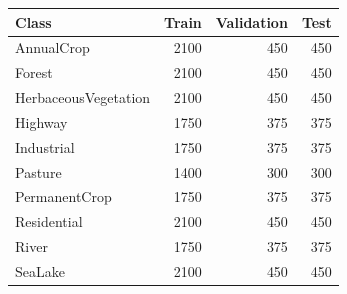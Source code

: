 \begin{tabular}{lrrr}
\toprule
Class & Train & Validation & Test \\
\midrule
AnnualCrop & 2100 & 450 & 450 \\
Forest & 2100 & 450 & 450 \\
HerbaceousVegetation & 2100 & 450 & 450 \\
Highway & 1750 & 375 & 375 \\
Industrial & 1750 & 375 & 375 \\
Pasture & 1400 & 300 & 300 \\
PermanentCrop & 1750 & 375 & 375 \\
Residential & 2100 & 450 & 450 \\
River & 1750 & 375 & 375 \\
SeaLake & 2100 & 450 & 450 \\
\bottomrule
\end{tabular}
